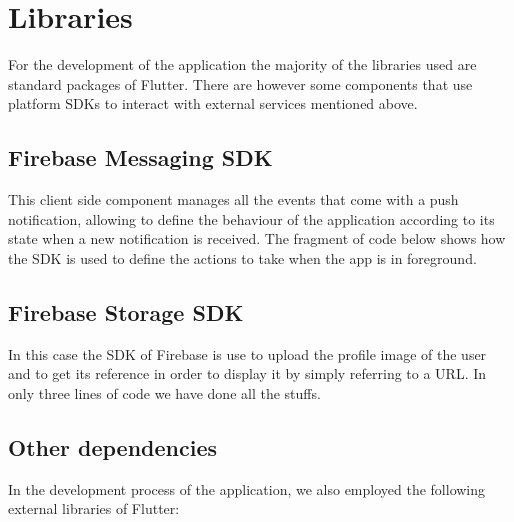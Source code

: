 \documentclass[../../dd.tex]{subfiles}
\begin{document}
    
    \section{Libraries}
    For the development of the application the majority of the libraries used are standard packages of Flutter. There are however some components that use platform SDKs to interact with external services mentioned above.
    
    \subsection{Firebase Messaging SDK}
    This client side component manages all the events that come with a push notification, allowing to define the behaviour of the application according to its state when a new notification is received. The fragment of code below shows how the SDK is used to define the actions to take when the app is in foreground.
     \vspace{2 mm}
    
    \vspace{8 mm}
    
    \subsection{Firebase Storage SDK}
    In this case the SDK of Firebase is use to upload the profile image of the user and to get its reference in order to display it by simply referring to a URL. In only three lines of code we have done all the stuffs.
     \vspace{2 mm}
    
    \vspace{8 mm}
    
    \subsection{Other dependencies}
    In the development process of the application, we also employed the following external libraries of Flutter:
    
\end{document}
